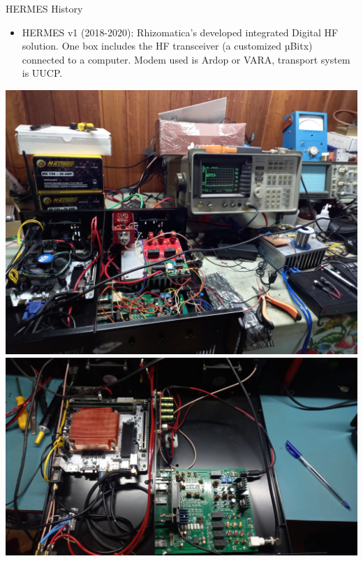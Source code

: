 \documentclass[aspectratio=169,xcolor={x11names,svgnames,dvipsnames}]{beamer}
\begin{document}
\begin{frame}{HERMES History}

  \begin{itemize}
    \item HERMES v1 (2018-2020): Rhizomatica's developed integrated Digital HF solution. One box includes the HF transceiver (a customized µBitx) connected to a computer. Modem used is Ardop or VARA, transport system is UUCP.
  \end{itemize}

  \includegraphics[width=.4\columnwidth]{pic3.jpg} \includegraphics[width=.49\columnwidth]{hermes2.jpeg}

\end{frame}
\end{document}
